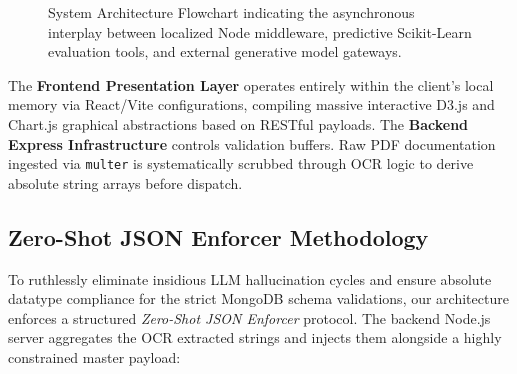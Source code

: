 \documentclass[conference]{IEEEtran}
\begin{document}
\begin{figure}[!ht]
\centering
{}
\caption{System Architecture Flowchart indicating the asynchronous interplay between localized Node middleware, predictive Scikit-Learn evaluation tools, and external generative model gateways.}
\label{fig:architecture}
\end{figure}

The \textbf{Frontend Presentation Layer} operates entirely within the client's local memory via React/Vite configurations, compiling massive interactive D3.js and Chart.js graphical abstractions based on RESTful payloads. The \textbf{Backend Express Infrastructure} controls validation buffers. Raw PDF documentation ingested via \texttt{multer} is systematically scrubbed through OCR logic to derive absolute string arrays before dispatch.

\subsection{Zero-Shot JSON Enforcer Methodology}
To ruthlessly eliminate insidious LLM hallucination cycles and ensure absolute datatype compliance for the strict MongoDB schema validations, our architecture enforces a structured \textit{Zero-Shot JSON Enforcer} protocol. The backend Node.js server aggregates the OCR extracted strings and injects them alongside a highly constrained master payload:
\end{document}
